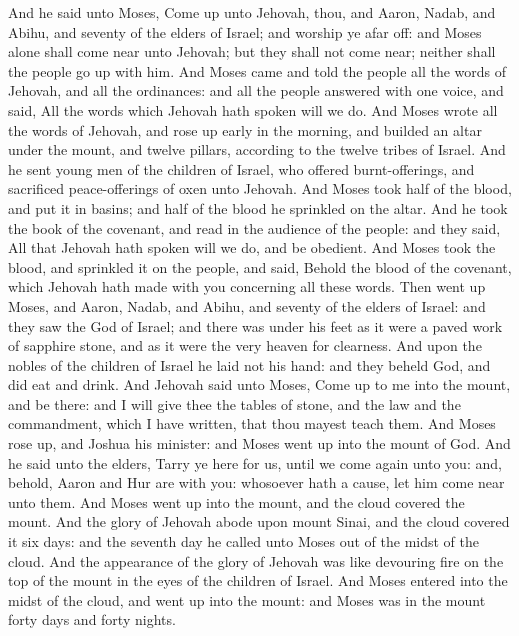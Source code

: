 And he said unto Moses, Come up unto Jehovah, thou, and Aaron, Nadab, and Abihu, and seventy of the elders of Israel; and worship ye afar off: and Moses alone shall come near unto Jehovah; but they shall not come near; neither shall the people go up with him. And Moses came and told the people all the words of Jehovah, and all the ordinances: and all the people answered with one voice, and said, All the words which Jehovah hath spoken will we do. And Moses wrote all the words of Jehovah, and rose up early in the morning, and builded an altar under the mount, and twelve pillars, according to the twelve tribes of Israel. And he sent young men of the children of Israel, who offered burnt-offerings, and sacrificed peace-offerings of oxen unto Jehovah. And Moses took half of the blood, and put it in basins; and half of the blood he sprinkled on the altar. And he took the book of the covenant, and read in the audience of the people: and they said, All that Jehovah hath spoken will we do, and be obedient. And Moses took the blood, and sprinkled it on the people, and said, Behold the blood of the covenant, which Jehovah hath made with you concerning all these words.  Then went up Moses, and Aaron, Nadab, and Abihu, and seventy of the elders of Israel: and they saw the God of Israel; and there was under his feet as it were a paved work of sapphire stone, and as it were the very heaven for clearness. And upon the nobles of the children of Israel he laid not his hand: and they beheld God, and did eat and drink.  And Jehovah said unto Moses, Come up to me into the mount, and be there: and I will give thee the tables of stone, and the law and the commandment, which I have written, that thou mayest teach them. And Moses rose up, and Joshua his minister: and Moses went up into the mount of God. And he said unto the elders, Tarry ye here for us, until we come again unto you: and, behold, Aaron and Hur are with you: whosoever hath a cause, let him come near unto them. And Moses went up into the mount, and the cloud covered the mount. And the glory of Jehovah abode upon mount Sinai, and the cloud covered it six days: and the seventh day he called unto Moses out of the midst of the cloud. And the appearance of the glory of Jehovah was like devouring fire on the top of the mount in the eyes of the children of Israel. And Moses entered into the midst of the cloud, and went up into the mount: and Moses was in the mount forty days and forty nights. 

